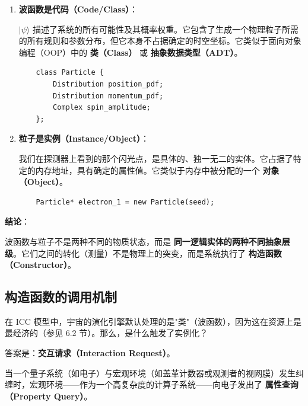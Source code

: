 \begin{enumerate}
\item \textbf{波函数是代码（Code/Class）}：

    $|\psi\rangle$ 描述了系统的所有可能性及其概率权重。它包含了生成一个物理粒子所需的所有规则和参数分布，但它本身不占据确定的时空坐标。它类似于面向对象编程（OOP）中的 \textbf{类（Class）} 或 \textbf{抽象数据类型（ADT）}。

    \begin{verbatim}
    class Particle {
        Distribution position_pdf;
        Distribution momentum_pdf;
        Complex spin_amplitude;
    };
    \end{verbatim}

\item \textbf{粒子是实例（Instance/Object）}：

    我们在探测器上看到的那个闪光点，是具体的、独一无二的实体。它占据了特定的内存地址，具有确定的属性值。它类似于内存中被分配的一个 \textbf{对象（Object）}。

    \begin{verbatim}
    Particle* electron_1 = new Particle(seed);
    \end{verbatim}
\end{enumerate}

\textbf{结论}：

波函数与粒子不是两种不同的物质状态，而是 \textbf{同一逻辑实体的两种不同抽象层级}。它们之间的转化（测量）不是物理上的突变，而是系统执行了 \textbf{构造函数（Constructor）}。

\subsection{构造函数的调用机制}

在 ICC 模型中，宇宙的演化引擎默认处理的是"类"（波函数），因为这在资源上是最经济的（参见 6.2 节）。那么，是什么触发了实例化？

答案是：\textbf{交互请求（Interaction Request）}。

当一个量子系统（如电子）与宏观环境（如盖革计数器或观测者的视网膜）发生纠缠时，宏观环境——作为一个高复杂度的计算子系统——向电子发出了 \textbf{属性查询（Property Query）}。

